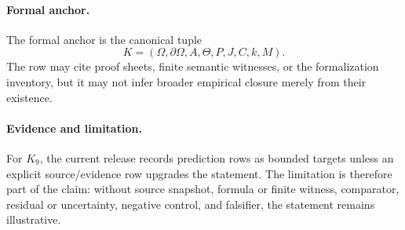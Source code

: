 \paragraph{Formal anchor.}
The formal anchor is the canonical tuple
\[
  K=(\Omega,\partial\Omega,A,\Theta,P,J,C,k,M).
\]
The row may cite proof sheets, finite semantic witnesses, or the formalization
inventory, but it may not infer broader empirical closure merely from their
existence.

\paragraph{Evidence and limitation.}
For \(K_9\), the current release records prediction rows as bounded
targets unless an explicit source/evidence row upgrades the statement. The
limitation is therefore part of the claim: without source snapshot, formula or
finite witness, comparator, residual or uncertainty, negative control, and
falsifier, the statement remains illustrative.
